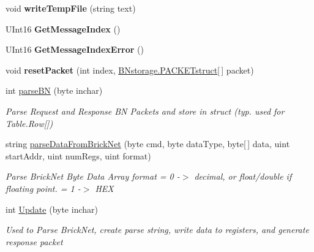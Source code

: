 \begin{DoxyCompactItemize}
\mbox{\label{class_b_n_a30_1_1_net_anal_b_n_a7d08c2f17e43e81ad7c85217c5840118}} 
void {\bfseries write\+Temp\+File} (string text)
\item 
\mbox{\label{class_b_n_a30_1_1_net_anal_b_n_a965eff5bb76aec4b433a6846ab222584}} 
U\+Int16 {\bfseries Get\+Message\+Index} ()
\item 
\mbox{\label{class_b_n_a30_1_1_net_anal_b_n_afc1a2cae0da9512fea8856ac9a39e4aa}} 
U\+Int16 {\bfseries Get\+Message\+Index\+Error} ()
\item 
\mbox{\label{class_b_n_a30_1_1_net_anal_b_n_a9beb0af83e694487d8a86b11a7b3bdf5}} 
void {\bfseries reset\+Packet} (int index, \mbox{\hyperlink{struct_b_n_a30_1_1_b_nstorage_1_1_p_a_c_k_e_tstruct}{B\+Nstorage.\+P\+A\+C\+K\+E\+Tstruct}}\mbox{[}$\,$\mbox{]} packet)
\item 
int \mbox{\hyperlink{class_b_n_a30_1_1_net_anal_b_n_a6e3432d24c574a4b35714894e5600896}{parse\+BN}} (byte inchar)
\begin{DoxyCompactList}\small\item\em Parse Request and Response BN Packets and store in struct (typ. used for Table.\+Row\mbox{[}\mbox{]}) \end{DoxyCompactList}\item 
string \mbox{\hyperlink{class_b_n_a30_1_1_net_anal_b_n_ae1d87164523595df1ccb1eaf9bf85f29}{parse\+Data\+From\+Brick\+Net}} (byte cmd, byte data\+Type, byte\mbox{[}$\,$\mbox{]} data, uint start\+Addr, uint num\+Regs, uint format)
\begin{DoxyCompactList}\small\item\em Parse Brick\+Net Byte Data Array format = 0 -\/$>$ decimal, or float/double if floating point. = 1 -\/$>$ H\+EX \end{DoxyCompactList}\item 
int \mbox{\hyperlink{class_b_n_a30_1_1_net_anal_b_n_ae51c43374cfe3a7fd258b31ae0602a47}{Update}} (byte inchar)
\begin{DoxyCompactList}\small\item\em Used to Parse Brick\+Net, create parse string, write data to registers, and generate response packet \end{DoxyCompactList}\item 
\mbox{\label{class_b_n_a30_1_1_net_anal_b_n_a7593586927532e9c52774c0ac5b3dcc0}} 

\end{DoxyCompactItemize}
